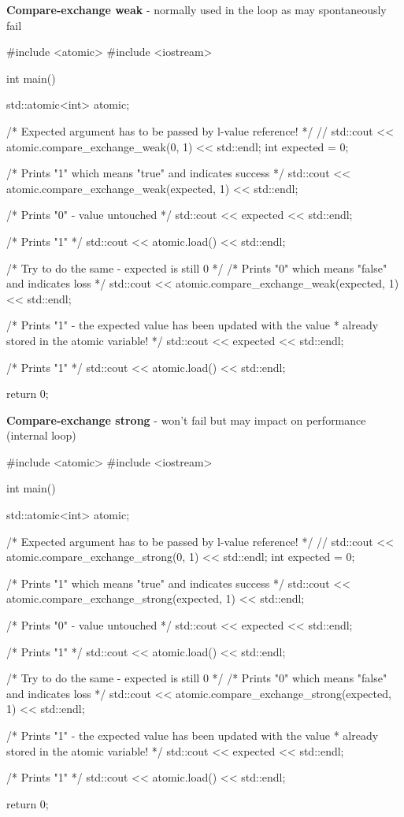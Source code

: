 \documentclass[../main]{subfiles}
\begin{document}
    \textbf{Compare-exchange weak} - normally used in the loop as may spontaneously  fail
\begin{Code}
    #include <atomic>
    #include <iostream>

    int main()
    {
        std::atomic<int> atomic;

        /* Expected argument has to be passed by l-value reference! */
        // std::cout << atomic.compare_exchange_weak(0, 1) << std::endl;
        int expected = 0;

        /* Prints "1" which means "true" and indicates success */
        std::cout << atomic.compare_exchange_weak(expected, 1) << std::endl;

        /* Prints "0" - value untouched */
        std::cout << expected << std::endl;

        /* Prints "1" */
        std::cout << atomic.load() << std::endl;

        /* Try to do the same - expected is still 0 */
        /* Prints "0" which means "false" and indicates loss */
        std::cout << atomic.compare_exchange_weak(expected, 1) << std::endl;

        /* Prints "1" - the expected value has been updated with the value
         * already stored in the atomic variable!
         */
        std::cout << expected << std::endl;

        /* Prints "1" */
        std::cout << atomic.load() << std::endl;

        return 0;
    }
\end{Code}

    \textbf{Compare-exchange strong} - won't fail but may impact on performance (internal loop)
\begin{Code}
    #include <atomic>
    #include <iostream>

    int main()
    {
        std::atomic<int> atomic;

        /* Expected argument has to be passed by l-value reference! */
        // std::cout << atomic.compare_exchange_strong(0, 1) << std::endl;
        int expected = 0;

        /* Prints "1" which means "true" and indicates success */
        std::cout << atomic.compare_exchange_strong(expected, 1) << std::endl;

        /* Prints "0" - value untouched */
        std::cout << expected << std::endl;

        /* Prints "1" */
        std::cout << atomic.load() << std::endl;

        /* Try to do the same - expected is still 0 */
        /* Prints "0" which means "false" and indicates loss */
        std::cout << atomic.compare_exchange_strong(expected, 1) << std::endl;

        /* Prints "1" - the expected value has been updated with the value
         * already stored in the atomic variable!
         */
        std::cout << expected << std::endl;

        /* Prints "1" */
        std::cout << atomic.load() << std::endl;

        return 0;
    }
\end{Code}
\end{document}
